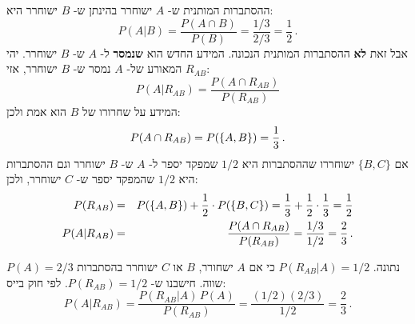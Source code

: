 \newpage



ההסתברות המותנית ש-%
$A$
ישוחרר בהינתן ש-%
$B$
ישוחרר היא:
\[
P(A|B) = \frac{P(A\cap B)}{P(B)} = \frac{1/3}{2/3}=\frac{1}{2}\,.
\]
אבל זאת 
\textbf{לא}
ההסתברות המותנית הנכונה. המידע החדש הוא
\textbf{שנמסר}
ל-%
$A$
ש-%
$B$
ישוחרר. יהי
$R_{AB}$
המאורע של-%
$A$
נמסר ש-%
$B$
ישוחרר, אזי:
\[
P(A|R_{AB}) = \frac{P(A\cap R_{AB})}{P(R_{AB})}
\]
המידע על שחרורו של
$B$
הוא אמת ולכן:
\[
P(A\cap R_{AB})=P(\{A,B\})=\displaystyle\frac{1}{3}\,.
\]
אם 
$\{B,C\}$
ישוחררו שההסתברות היא
$1/2$
שמפקד יספר ל-%
$A$
ש-%
$B$
ישוחרר וגם ההסתברות היא
$1/2$
שהמפקד יספר ש-%
$C$
ישוחרר, ולכן:
\begin{eqnarray*}
P(R_{AB})&=&P(\{A,B\})+\displaystyle\frac{1}{2}\cdot P(\{B,C\})=\displaystyle\frac{1}{3}+\displaystyle\frac{1}{2}\cdot \displaystyle\frac{1}{3}=\displaystyle\frac{1}{2}\\
P(A|R_{AB}) &=& \frac{P(A\cap R_{AB})}{P(R_{AB})} = \displaystyle\frac{1/3}{1/2}=\displaystyle\frac{2}{3}\,.
\end{eqnarray*}



$P(A)=2/3$
נתונה. 
$P(R_{AB}|A)=1/2$
כי אם 
$A$
ישחורר,
$B$
או
$C$
ישוחרר בהסתברות שווה. חישבנו ש-%
$P(R_{AB})=1/2$.
לפי חוק בייס:
\[
P(A|R_{AB})= \frac{P(R_{AB}|A)\,P(A)}{P(R_{AB})} = \displaystyle\frac{(1/2)(2/3)}{1/2}=\displaystyle\frac{2}{3}\,.
\]


